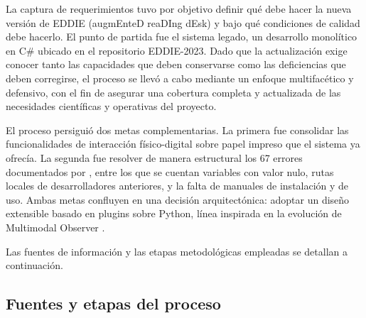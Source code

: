 La captura de requerimientos tuvo por objetivo definir qué debe hacer la nueva versión de EDDIE (augmEnteD reaDIng dEsk) y bajo qué condiciones de calidad debe hacerlo. El punto de partida fue el sistema legado, un desarrollo monolítico en C\# ubicado en el repositorio EDDIE-2023. Dado que la actualización exige conocer tanto las capacidades que deben conservarse como las deficiencias que deben corregirse, el proceso se llevó a cabo mediante un enfoque multifacético y defensivo, con el fin de asegurar una cobertura completa y actualizada de las necesidades científicas y operativas del proyecto.
 
El proceso persiguió dos metas complementarias. La primera fue consolidar las funcionalidades de interacción físico-digital sobre papel impreso que el sistema ya ofrecía. La segunda fue resolver de manera estructural los 67 errores documentados por \cite{ibaceta2023evaluacion}, entre los que se cuentan variables con valor nulo, rutas locales de desarrolladores anteriores, y la falta de manuales de instalación y de uso. Ambas metas confluyen en una decisión arquitectónica: adoptar un diseño extensible basado en plugins sobre Python, línea inspirada en la evolución de Multimodal Observer \citep{figueroa2025arquitectura}.
 
Las fuentes de información y las etapas metodológicas empleadas se detallan a continuación.
 
\subsection{Fuentes y etapas del proceso}
 
